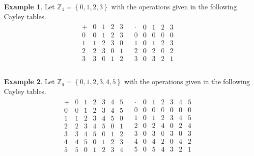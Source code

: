 \documentclass[
]{book}
\theoremstyle{definition}
\theoremstyle{definition}
\newtheorem{example}{Example}[chapter]
\theoremstyle{definition}
\theoremstyle{remark}
\begin{document}
\begin{example}
\protect\hypertarget{exm:z4ring}{}{\label{exm:z4ring} }Let \(\mathbb{Z}_4=\left\{ 0,1, 2, 3 \right\}\) with the operations given in the following Cayley tables.
\[\begin{array}{cc}
\begin{array}{c|cccc}
+ & 0 & 1 & 2 & 3  \\ \hline
0 & 0 & 1 & 2 & 3 \\
1 & 1 & 2 & 3 & 0 \\
2 & 2 & 3 & 0 & 1 \\
3 & 3 & 0 & 1 & 2 \\
\end{array}
&
\begin{array}{c|cccc}
\cdot & 0 & 1 & 2 & 3 \\ \hline
0 & 0 & 0  & 0 & 0 \\
1 & 0 & 1 & 2 & 3 \\
2 & 0 & 2 & 0 & 2 \\
3 & 0 & 3 & 2 & 1 \\
\end{array}\\
\end{array}\]
\end{example}

\begin{example}
\protect\hypertarget{exm:z6ring}{}{\label{exm:z6ring} }Let \(\mathbb{Z}_6=\left\{ 0,1, 2, 3, 4, 5 \right\}\) with the operations given in the following Cayley tables.
\[\begin{array}{cc}
\begin{array}{c|cccccc}
+ & 0 & 1 & 2 & 3 & 4 & 5 \\ \hline
0 & 0 & 1 & 2 & 3 & 4 & 5 \\
1 & 1 & 2 & 3 & 4 & 5 & 0\\
2 & 2 & 3 & 4 & 5 & 0 & 1 \\
3 & 3 & 4 & 5 & 0 & 1 & 2 \\
4 & 4 & 5 & 0 & 1 & 2 & 3 \\
5 & 5 & 0 & 1 & 2 & 3 & 4 \\
\end{array}
&
\begin{array}{c|cccccc}
\cdot & 0 & 1 & 2 & 3 & 4 & 5 \\ \hline
0 & 0 & 0  & 0 & 0 & 0 & 0 \\
1 & 0 & 1 & 2 & 3 & 4 & 5\\
2 & 0 & 2 & 4 & 0 & 2 & 4 \\
3 & 0 & 3 & 0 & 3 & 0 & 3 \\
4 & 0 & 4 & 2 & 0 & 4 & 2 \\
5 & 0 & 5 & 4 & 3 & 2 & 1 \\
\end{array}
\end{array}\]
\end{example}
\end{document}
